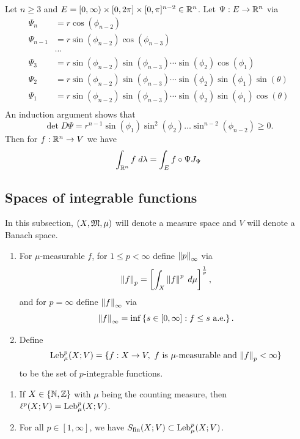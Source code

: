 \documentclass[a4paper]{article}
\begin{document}
\begin{eg}
Let $n \geq 3$ and $E = [0, \infty) \times [0, 2 \pi]
\times [0, \pi]^{n-2} \in \mathbb{R}^n$. Let $\Psi: E \to \mathbb{R}^n$
via
\[
\begin{aligned}
\Psi_n &= r \cos (\phi_{n-2}) \\
\Psi_{n-1} &= r \sin (\phi_{n-2}) \cos (\phi_{n-3}) \\
&\cdots \\
\Psi_3 &= r \sin (\phi_{n-2}) \sin (\phi_{n-3}) \cdots \sin (\phi_2)
\cos (\phi_1) \\
\Psi_2 &= r \sin (\phi_{n-2}) \sin (\phi_{n-3}) \cdots \sin (\phi_2)
\sin (\phi_1) \sin (\theta) \\
\Psi_1 &= r \sin (\phi_{n-2}) \sin (\phi_{n-3}) \cdots \sin (\phi_2)
\sin (\phi_1) \cos (\theta) \\
\end{aligned}
\]
An induction argument shows that
\[
\det D\Psi = r^{n-1} \sin (\phi_1) \sin^2 (\phi_2)
\dots \sin^{n-2} (\phi_{n-2}) \geq 0.
\]
Then for $f : \mathbb{R}^n \to V$ we have
\[
\int_{\mathbb{R}^n} f \; d \lambda = \int_E f \circ \Psi J_{\Psi}
\]
\end{eg}

\subsection{Spaces of integrable functions}

In this subsection, $(X, \mathfrak{M}, \mu)$ will denote a measure
space and $V$ will denote a Banach space.

\begin{defi}
\begin{enumerate}
\item For $\mu$-measurable $f$, for $1 \leq p < \infty$
define $\left\lVert p\right\rVert_\infty$ via
\[
\left\lVert f\right\rVert_p = \left[ \int_X \left\lVert f\right\rVert^p \; d \mu \right]^{\frac{1}{p}},
\]
and for $p = \infty$ define $\left\lVert f\right\rVert_\infty$ via
\[
\left\lVert f\right\rVert_\infty = \inf \left\{ s \in [0, \infty] : f
\leq s \text{ a.e.} \right\}.
\]

\item Define
\[
\operatorname{Leb}_\mu^p (X; V) = \{ f : X \to V, \text{ $f$ is $\mu$-measurable
and $\left\lVert f\right\rVert_p < \infty$} \}
\]
to be the set of $p$-integrable functions.
\end{enumerate}
\end{defi}

\begin{eg}
\begin{enumerate}
\item If $X \in \{\mathbb{N}, \mathbb{Z}\}$ with $\mu$ being the counting
measure, then $\ell^p(X; V) = \operatorname{Leb}_\mu^p (X; V)$.

\item For all $p \in [1, \infty]$, we have
$S_{\text{fin}}(X; V) \subset \operatorname{Leb}_\mu^p (X; V)$.
\end{enumerate}
\end{eg}
\end{document}

